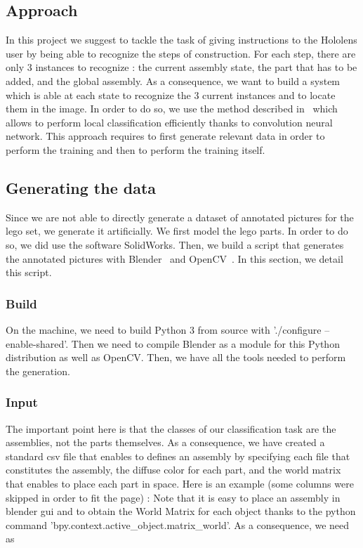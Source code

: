 \subsection{Approach}

In this project we suggest to tackle the task of giving instructions to the Hololens user by being able to 
recognize the steps of construction. For each step, there are only 3 instances to recognize : the current 
assembly state, the part that has to be added, and the global assembly. As a consequence, we want to build a 
system which is able at each state to recognize the 3 current instances and to locate them in the image.
\medbreak
In order to do so, we use the method described in~\cite{redmon_you_2015} which allows to perform 
local classification efficiently thanks to convolution neural network. This approach requires to first 
generate relevant data in order to perform the training and then to perform the training itself.

\subsection{Generating the data}

Since we are not able to directly generate a dataset of annotated pictures for the lego set, we generate it 
artificially. We first model the lego parts. In order to do so, we did use the software SolidWorks. Then, 
we build a script that generates the annotated pictures with Blender~\cite{blender} and 
OpenCV~\cite{opencv_library}. In this section, we detail this script.

\subsubsection{Build}

On the machine, we need to build Python 3 from source with './configure --enable-shared'. Then we need 
to compile Blender as a module for this Python distribution as well as OpenCV. Then, we have all the tools 
needed to perform the generation.

\subsubsection{Input}

The important point here is that the classes of our classification task are the assemblies, not the parts 
themselves. As a consequence, we have created a standard csv file that enables to defines an assembly by 
specifying each file that constitutes the assembly, the diffuse color for each part, and the world matrix 
that enables to place each part in space. Here is an example (some columns were skipped in order to fit 
the page) : 
\medbreak
\footnotesize{} 
\medbreak
\normalsize
Note that it is easy to place an assembly in blender gui and to obtain the World Matrix for each object 
thanks to the python command 'bpy.context.active\_object.matrix\_world'.
As a consequence, we need as 







